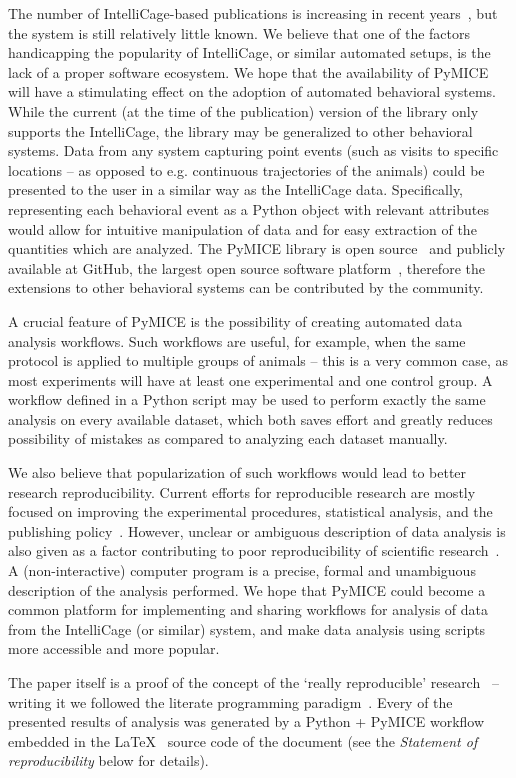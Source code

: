 The number of
IntelliCage-based publications is increasing in recent years~\cite{IntelliCageReferenceList},
but the system is still relatively little known. We believe that one of the factors
handicapping the popularity of IntelliCage, or similar automated setups, is the lack of a proper
software ecosystem. We hope that the availability of PyMICE will have a stimulating
effect on the adoption of automated behavioral systems.
While the current (at the time of the publication) version of the library
only supports the IntelliCage, the library may be generalized to other behavioral systems.
Data from any system capturing point events (such as
visits to specific locations -- as opposed to e.g. continuous trajectories of the animals)
could be presented to the user in a similar way as the IntelliCage data.
Specifically, representing each behavioral event as a Python object
with relevant attributes would allow for intuitive manipulation of data
and for easy extraction of the quantities which are analyzed.
The PyMICE library is open source~\cite{gpl} and publicly available at
GitHub, the largest open source software platform~\cite{gousios2014},
therefore the extensions to other behavioral systems can be contributed by the community.

A crucial feature of PyMICE is the possibility of creating automated
data analysis workflows. Such workflows are useful, for example, when the same
protocol is applied to multiple groups of animals -- this is a very common case,
as most experiments will have at least one experimental and one control group.
A workflow defined in a Python script may be used to perform exactly the same
analysis on every available dataset, which both saves effort and greatly reduces
possibility of mistakes as compared to analyzing each dataset manually.

We also believe that popularization of such workflows would
lead to better research reproducibility.
Current efforts for reproducible research are mostly focused on improving the
experimental procedures, statistical analysis, and the publishing
policy~\cite{begley2012,begley2013,halsey2015}. However, unclear or ambiguous
description of data analysis is also given as a factor contributing to
poor reproducibility of scientific research~\cite{ince2012}. A (non-interactive)
computer program is a
precise, formal and unambiguous description of the analysis performed.
We hope that PyMICE could become a common platform for implementing
and sharing workflows for analysis of data from the IntelliCage (or similar) system, and
make data analysis using scripts more accessible and more popular.

The paper itself is a proof of the concept of the `really reproducible'
research~\cite{buckheit1995} -- writing it we followed the
literate programming paradigm~\cite{literateProgramming}. Every of the presented
results of analysis was generated by a Python + PyMICE workflow embedded in the
\LaTeX{}~\cite{latex} source code of the document (see the \emph{Statement of reproducibility} below for
details).

